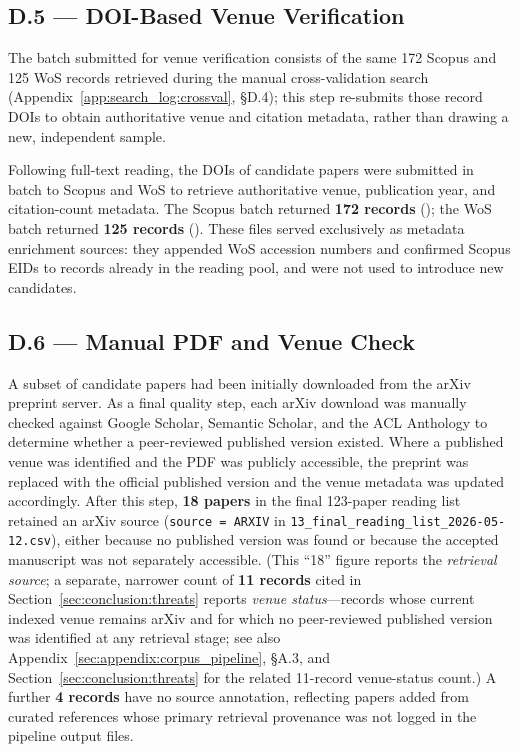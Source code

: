 \subsection*{D.5 — DOI-Based Venue Verification}
\label{app:search_log:doi}

The batch submitted for venue verification consists of the same 172 Scopus and
125 WoS records retrieved during the manual cross-validation search
(Appendix~\ref{app:search_log:crossval}, \S D.4); this step re-submits those
record DOIs to obtain authoritative venue and citation metadata, rather than
drawing a new, independent sample.

Following full-text reading, the DOIs of candidate papers were submitted in batch to
Scopus and WoS to retrieve authoritative venue, publication year, and citation-count
metadata. The Scopus batch returned \textbf{172 records}
(\texttt{}); the WoS batch returned
\textbf{125 records} (\texttt{}). These
files served exclusively as metadata enrichment sources: they appended WoS accession
numbers and confirmed Scopus EIDs to records already in the reading pool, and were not
used to introduce new candidates.

\subsection*{D.6 — Manual PDF and Venue Check}
\label{app:search_log:pdf}

A subset of candidate papers had been initially downloaded from the arXiv preprint
server. As a final quality step, each arXiv download was manually checked against
Google Scholar, Semantic Scholar, and the ACL Anthology to determine whether a
peer-reviewed published version existed. Where a published venue was identified and
the PDF was publicly accessible, the preprint was replaced with the official published
version and the venue metadata was updated accordingly. After this step,
\textbf{18 papers} in the final 123-paper reading list retained an arXiv source
(\texttt{source = ARXIV} in \texttt{13\_final\_reading\_list\_2026-05-12.csv}),
either because no published version was found or because the accepted manuscript was
not separately accessible. (This ``18'' figure reports the \emph{retrieval source};
a separate, narrower count of \textbf{11 records} cited in
Section~\ref{sec:conclusion:threats} reports \emph{venue status}---records
whose current indexed venue remains arXiv and for which no peer-reviewed
published version was identified at any retrieval stage; see also
Appendix~\ref{sec:appendix:corpus_pipeline}, \S A.3, and
Section~\ref{sec:conclusion:threats} for the related 11-record venue-status
count.) A further \textbf{4 records} have no source annotation,
reflecting papers added from curated references whose primary retrieval provenance was
not logged in the pipeline output files.
